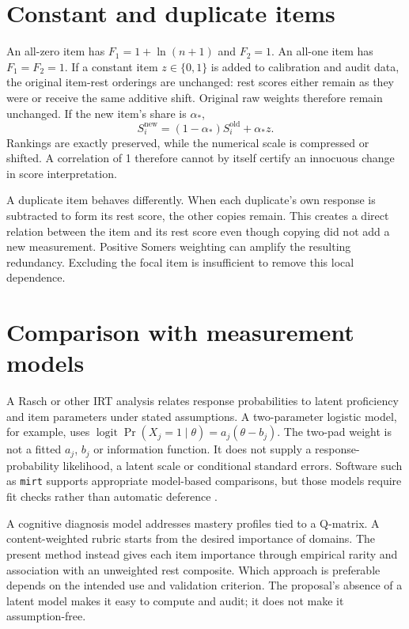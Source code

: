 \documentclass[11pt,a4paper,oneside,headings=normal,parskip=half]{scrreprt}
\newcommand{\code}[1]{\nolinkurl{#1}}
\begin{document}
\section{Constant and duplicate items}
An all-zero item has $F_1=1+\ln(n+1)$ and $F_2=1$. An all-one item has $F_1=F_2=1$. If a constant item $z\in\{0,1\}$ is added to calibration and audit data, the original item-rest orderings are unchanged: rest scores either remain as they were or receive the same additive shift. Original raw weights therefore remain unchanged. If the new item's share is $\alpha_*$,
\begin{equation}
S_i^{\mathrm{new}}=(1-\alpha_*)S_i^{\mathrm{old}}+\alpha_*z.\label{eq:constant}
\end{equation}
Rankings are exactly preserved, while the numerical scale is compressed or shifted. A correlation of 1 therefore cannot by itself certify an innocuous change in score interpretation.

A duplicate item behaves differently. When each duplicate's own response is subtracted to form its rest score, the other copies remain. This creates a direct relation between the item and its rest score even though copying did not add a new measurement. Positive Somers weighting can amplify the resulting redundancy. Excluding the focal item is insufficient to remove this local dependence.

\section{Comparison with measurement models}
A Rasch or other IRT analysis relates response probabilities to latent proficiency and item parameters under stated assumptions. A two-parameter logistic model, for example, uses $\operatorname{logit}\Pr(X_j=1\mid\theta)=a_j(\theta-b_j)$. The two-pad weight is not a fitted $a_j$, $b_j$ or information function. It does not supply a response-probability likelihood, a latent scale or conditional standard errors. Software such as \code{mirt} supports appropriate model-based comparisons, but those models require fit checks rather than automatic deference \citep{mirt}.

A cognitive diagnosis model addresses mastery profiles tied to a Q-matrix. A content-weighted rubric starts from the desired importance of domains. The present method instead gives each item importance through empirical rarity and association with an unweighted rest composite. Which approach is preferable depends on the intended use and validation criterion. The proposal's absence of a latent model makes it easy to compute and audit; it does not make it assumption-free.
\end{document}
